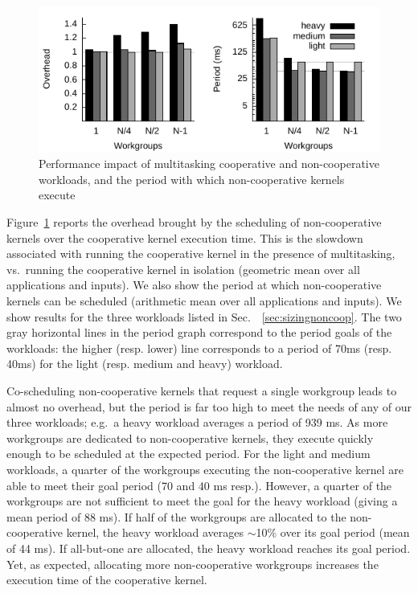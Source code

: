 \documentclass[parskip=half,sigconf,review, anonymous=true, acmcopyrightmode=none]{acmart}
\newcommand{\myfiglong}{Figure~}
\newcommand{\mysec}{Sec.~}
\begin{document}
\begin{figure}
\includegraphics[width=\columnwidth]{heavy.pdf} 
\caption{Performance impact of multitasking cooperative and non-cooperative workloads, and the period with which non-cooperative kernels execute}\label{fig:performance}
\vspace{-5mm}
\end{figure}


 \myfiglong\ref{fig:performance} reports the
overhead brought by the scheduling of non-cooperative kernels over the
cooperative kernel execution time.  This is the slowdown associated
with running the cooperative kernel in the presence of multitasking,
vs.\ running the cooperative kernel in isolation (geometric mean over
all applications and inputs).  We also show the period at which
non-cooperative kernels can be scheduled (arithmetic mean over all
applications and inputs).
We show results for the three workloads listed in
\mysec~\ref{sec:sizingnoncoop}. The two gray horizontal lines in the
period graph correspond to the period goals of the workloads: the
higher (resp. lower) line corresponds to a period of 70ms (resp. 40ms)
for the light (resp. medium and heavy) workload.

Co-scheduling non-cooperative kernels that request a single workgroup leads to almost no overhead, but the period is far too high to meet the needs
of any of our three workloads; e.g.\ a heavy workload averages a
period of 939 ms. As more workgroups are dedicated to non-cooperative
kernels, they execute quickly enough to be scheduled at the expected
period. For the light and medium workloads, a quarter
of the workgroups executing the non-cooperative kernel are able to meet
their goal period (70 and 40 ms resp.). However, a quarter of the
workgroups are not sufficient to meet the goal for the heavy workload
(giving a mean period of 88 ms). If half of the workgroups are
allocated to the non-cooperative kernel, the heavy workload averages $\sim$10\% over its goal period (mean of 44 ms). If all-but-one are allocated, the heavy workload reaches its goal period.
%
Yet, as expected, allocating more non-cooperative workgroups increases
the execution time of the cooperative kernel.
\end{document}
